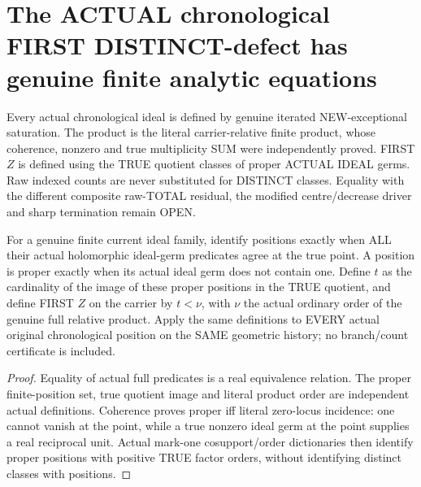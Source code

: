\section{The ACTUAL chronological FIRST DISTINCT-defect has genuine finite analytic equations}

Every actual chronological ideal is defined by genuine iterated NEW-exceptional
saturation. The product is the literal carrier-relative finite product, whose
coherence, nonzero and true multiplicity SUM were independently proved.
FIRST $Z$ is defined using the TRUE quotient classes of proper ACTUAL IDEAL
germs. Raw indexed counts are never substituted for DISTINCT classes.
Equality with the different composite raw-TOTAL residual, the modified
centre/decrease driver and sharp termination remain OPEN.

\begin{definition}
\label{hir:sharp-actual-chronological-distinct-defect-objects}
\leanok
For a genuine finite current ideal family, identify positions exactly when
ALL their actual holomorphic ideal-germ predicates agree at the true point.
A position is proper exactly when its actual ideal germ does not contain
one. Define $t$ as the cardinality of the image of these proper positions
in the TRUE quotient, and define FIRST $Z$ on the carrier by $t<\nu$, with
$\nu$ the actual ordinary order of the genuine full relative product.
Apply the same definitions to EVERY actual original chronological position
on the SAME geometric history; no branch/count certificate is included.
\end{definition}
\begin{proof}
Equality of actual full predicates is a real equivalence relation. The
proper finite-position set, true quotient image and literal product order
are independent actual definitions. Coherence proves proper iff literal
zero-locus incidence: one cannot vanish at the point, while a true nonzero
ideal germ at the point supplies a real reciprocal unit. Actual mark-one
cosupport/order dictionaries then identify proper positions with positive
TRUE factor orders, without identifying distinct classes with positions.
\end{proof}

